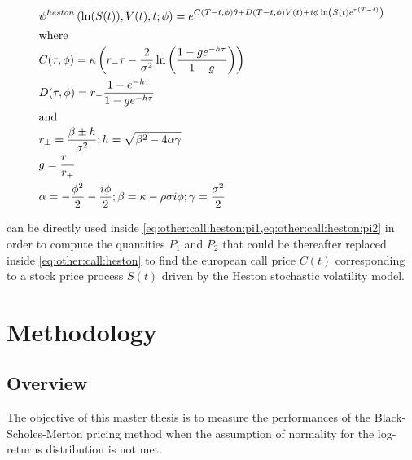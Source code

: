 \documentclass[12pt]{report}
\begin{document}
\begin{align}
  &\psi^{heston}\left(\ln(S(t)),V(t),t;\phi\right) = e^{C(T-t, \phi)\theta + D(T-t, \phi)V(t) + i\phi\ln\left(S(t)e^{r(T-t)}\right)} \label{eq:other:heston:psi} \\
  \intertext{where}
  &C(\tau, \phi) = \kappa \left(r_{-} \tau - \frac{2}{\sigma^2}\ln\left(\frac{1 - g e^{-h\tau}}{1 - g}\right)\right) \notag \\
  &D(\tau, \phi) = r_{-}\frac{1 - e^{-h\tau}}{1 - ge^{-h\tau}} \notag \\ 
  \intertext{and}
  &r_{\pm} = \frac{\beta \pm h}{\sigma^2}; h = \sqrt{\beta^2 - 4\alpha\gamma} \notag \\
  &g = \frac{r_{-}}{r_{+}} \notag \\
  &\alpha = -\frac{\phi^2}{2} - \frac{i\phi}{2}; \beta = \kappa - \rho\sigma i\phi; \gamma = \frac{\sigma^2}{2} \notag
\end{align}

 can be directly used inside \cref{eq:other:call:heston:pi1,eq:other:call:heston:pi2} in order to compute the quantities $P_1$ and $P_2$ that could be thereafter replaced inside \cref{eq:other:call:heston} to find the european call price  $C(t)$ corresponding to a stock price process $S(t)$ driven by the Heston stochastic volatility model.

























%
%
\chapter{Methodology}
\label{cha:Methodology}


\section{Overview}
\label{sec:methodology:overview}

The objective of this master thesis is to measure the performances of the Black-Scholes-Merton pricing method when the assumption of normality for the log-returns distribution is not met.
\end{document}
